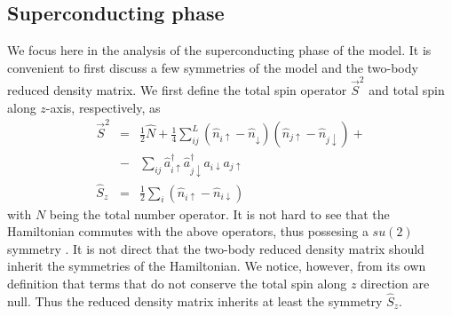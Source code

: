 \documentclass[prb,reprint,showpacs,twocolumn,superscriptaddress]{revtex4-2}
\newcommand{\ad}[1]{\hat a^{\dagger}_{#1}}
\begin{document}
\subsection{Superconducting phase}
\label{subsec.superconducting}

We focus here in the analysis of the superconducting phase of the model. It is convenient to first discuss a few symmetries of the model and the two-body reduced density matrix. We first define the total spin operator $\vec{S}^2$ and total spin along $z$-axis, respectively, as
\begin{eqnarray}
  \vec{S}^{2} &=& \frac{1}{2}\hat N+\frac{1}{4}\sum_{ij}^{L}\left(\hat n_{i \uparrow}- \hat n_{\downarrow}\right) \left(\hat n_{j\uparrow }- \hat n_{j\downarrow }\right) + \nonumber \\
  &-&\sum_{ij}\ad{i \uparrow}\ad{j\downarrow}a_{i\downarrow}a_{j \uparrow} \\
  \hat S_z &=& \frac{1}{2}\sum_i (\hat n_{i\uparrow }- \hat n_{i\downarrow })
 \end{eqnarray}
 with $N$ being the total number operator. It is not hard to see that the Hamiltonian commutes with the above operators, thus possesing a $su(2)$ symmetry \cite{essler2005}. It is not direct that the two-body reduced density matrix should inherit the symmetries of the Hamiltonian. We notice, however, from its own definition that terms that do not conserve the total spin along $z$ direction are null. Thus the reduced density matrix inherits at least the symmetry $\hat S_z$.
 
\end{document}

